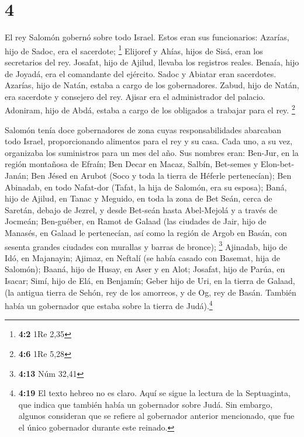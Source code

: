 \hypertarget{section-3}{%
\section{4}\label{section-3}}

 El rey Salomón gobernó sobre todo Israel. 
Estos eran sus funcionarios: Azarías, hijo de Sadoc, era el sacerdote;
\footnote{\textbf{4:2} 1Re 2,35}  Elijoref y Ahías, hijos
de Sisá, eran los secretarios del rey. Josafat, hijo de Ajilud, llevaba
los registros reales.  Benaía, hijo de Joyadá, era el
comandante del ejército. Sadoc y Abiatar eran sacerdotes. 
Azarías, hijo de Natán, estaba a cargo de los gobernadores. Zabud, hijo
de Natán, era sacerdote y consejero del rey.  Ajisar era
el administrador del palacio. Adoniram, hijo de Abdá, estaba a cargo de
los obligados a trabajar para el rey. \footnote{\textbf{4:6} 1Re 5,28}

 Salomón tenía doce gobernadores de zona cuyas
responsabilidades abarcaban todo Israel, proporcionando alimentos para
el rey y su casa. Cada uno, a su vez, organizaba los suministros para un
mes del año.  Sus nombres eran: Ben-Jur, en la región
montañosa de Efraín;  Ben Decar en Macaz, Salbín,
Bet-semes y Elon-bet-Janán;  Ben Jésed en Arubot (Soco y
toda la tierra de Héferle pertenecían);  Ben Abinadab, en
todo Nafat-dor (Tafat, la hija de Salomón, era su esposa);
 Baná, hijo de Ajilud, en Tanac y Meguido, en toda la
zona de Bet Seán, cerca de Saretán, debajo de Jezrel, y desde Bet-seán
hasta Abel-Mejolá y a través de Jocmeán;  Ben-guéber, en
Ramot de Galaad (las ciudades de Jair, hijo de Manasés, en Galaad le
pertenecían, así como la región de Argob en Basán, con sesenta grandes
ciudades con murallas y barras de bronce); \footnote{\textbf{4:13} Núm
  32,41}  Ajinadab, hijo de Idó, en Majanayin;
 Ajimaz, en Neftalí (se había casado con Basemat, hija de
Salomón);  Baaná, hijo de Husay, en Aser y en Alot;
 Josafat, hijo de Parúa, en Isacar;  Simí,
hijo de Elá, en Benjamín;  Geber hijo de Uri, en la
tierra de Galaad, (la antigua tierra de Sehón, rey de los amorreos, y de
Og, rey de Basán. También había un gobernador que estaba sobre la tierra
de Judá).\footnote{\textbf{4:19} El texto hebreo no es claro. Aquí se
  sigue la lectura de la Septuaginta, que indica que también había un
  gobernador sobre Judá. Sin embargo, algunos consideran que se refiere
  al gobernador anterior mencionado, que fue el único gobernador durante
  este reinado.}


